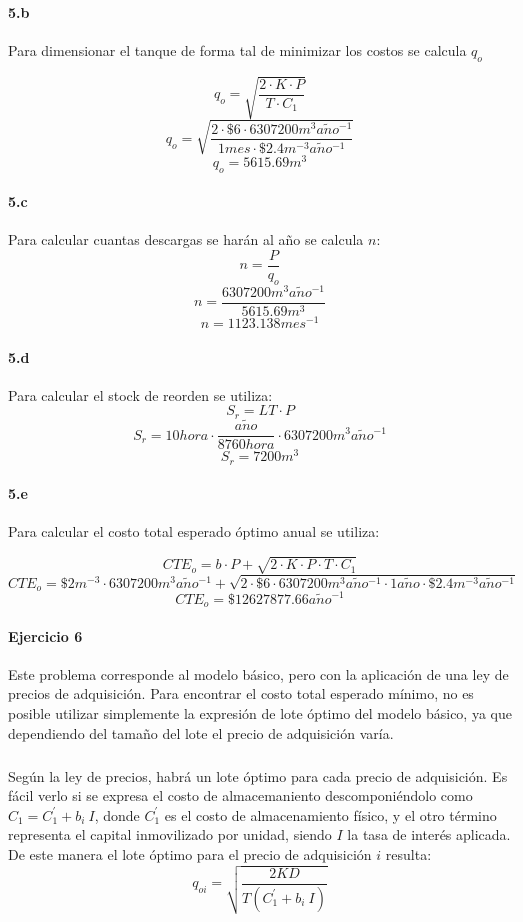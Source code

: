 \documentclass[a4paper,10pt]{article}
\def \anio {a\tilde{n}o}
\begin{document}
  \paragraph{5.b}
  Para dimensionar el tanque de forma tal de minimizar los costos se calcula $q_o$
  
  $$q_o = \sqrt{\frac{2 \cdot K \cdot P}{T \cdot C_1}}$$
  $$q_o = \sqrt{\frac{2 \cdot \$6 \cdot 6307200 m^3 \anio^{-1}}{1 mes \cdot \$2.4 m^{-3}\anio^{-1}}} $$
  $$\boxed{q_o = 5615.69 m^3} $$

  \paragraph{5.c}
  Para calcular cuantas descargas se har\'an al a\~no se calcula $n$:
  $$n = \frac{P}{q_o} $$
  $$n = \frac{6307200 m^3 \anio^{-1}}{5615.69 m^3} $$
  $$\boxed{n = 1123.138 mes^{-1}} $$

  \paragraph{5.d}
  Para calcular el stock de reorden se utiliza:
  $$S_r = LT \cdot P $$
  $$S_r = 10 hora \cdot \frac{\anio}{8760 hora} \cdot  6307200 m^3 \anio^{-1} $$
  $$\boxed{S_r = 7200 m^3 }$$
  
  \paragraph{5.e}
  Para calcular el costo total esperado \'optimo anual se utiliza:

  $$CTE_o = b \cdot P + \sqrt{2 \cdot K \cdot P \cdot T \cdot C_1} $$
  $$CTE_o = \$2 m^{-3} \cdot 6307200 m^3 \anio^{-1} + \sqrt{2 \cdot \$6 \cdot 6307200 m^3 \anio^{-1} \cdot 1 \anio \cdot \$2.4 m^{-3}\anio^{-1} }$$
  $$\boxed{CTE_o = \$12627877.66 \anio^{-1}} $$




\paragraph{Ejercicio 6}
	Este problema corresponde al modelo básico, pero con la aplicación de una ley de precios de adquisición. Para encontrar el costo total esperado mínimo, no es posible utilizar simplemente la expresión de lote óptimo del modelo básico, ya que dependiendo del tamaño del lote el precio de adquisición varía.

	\subparagraph{} Según la ley de precios, habrá un lote óptimo para cada precio de adquisición. Es fácil verlo si se expresa el costo de almacemaniento descomponiéndolo como $C_1 = C_1^{'} + b_i\ I$, donde $C_1^{'}$ es el costo de almacenamiento físico, y el otro término representa el capital inmovilizado por unidad, siendo $I$ la tasa de interés aplicada. De este manera el lote óptimo para el precio de adquisición $ i $ resulta:
	$$ q_{oi} = \sqrt{ \frac{2KD}{T \left( C_1^{'} + b_i\ I \right)} } $$
\end{document}
